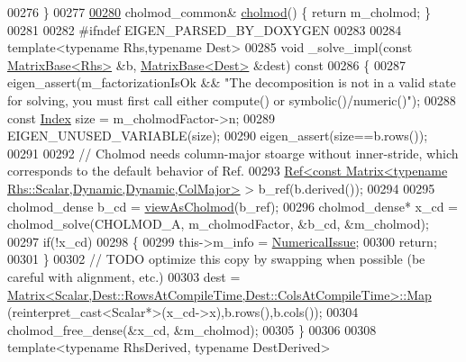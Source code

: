 \begin{DoxyCode}
00276     \}
00277     
\hyperlink{class_eigen_1_1_cholmod_base_a6a85bf52d6aa480240a64f277d7f96c6}{00280}     cholmod\_common& \hyperlink{class_eigen_1_1_cholmod_base_a6a85bf52d6aa480240a64f277d7f96c6}{cholmod}() \{ \textcolor{keywordflow}{return} m\_cholmod; \}
00281     
00282 \textcolor{preprocessor}{    #ifndef EIGEN\_PARSED\_BY\_DOXYGEN}
00283 
00284     \textcolor{keyword}{template}<\textcolor{keyword}{typename} Rhs,\textcolor{keyword}{typename} Dest>
00285     \textcolor{keywordtype}{void} \_solve\_impl(\textcolor{keyword}{const} \hyperlink{group___core___module_class_eigen_1_1_matrix_base}{MatrixBase<Rhs>} &b, \hyperlink{group___core___module_class_eigen_1_1_matrix_base}{MatrixBase<Dest>} &dest)\textcolor{keyword}{ const}
00286 \textcolor{keyword}{    }\{
00287       eigen\_assert(m\_factorizationIsOk && \textcolor{stringliteral}{"The decomposition is not in a valid state for solving, you must
       first call either compute() or symbolic()/numeric()"});
00288       \textcolor{keyword}{const} \hyperlink{namespace_eigen_a62e77e0933482dafde8fe197d9a2cfde}{Index} size = m\_cholmodFactor->n;
00289       EIGEN\_UNUSED\_VARIABLE(size);
00290       eigen\_assert(size==b.rows());
00291       
00292       \textcolor{comment}{// Cholmod needs column-major stoarge without inner-stride, which corresponds to the default behavior
       of Ref.}
00293       \hyperlink{group___core___module_class_eigen_1_1_ref}{Ref<const Matrix<typename Rhs::Scalar,Dynamic,Dynamic,ColMajor>}
       > b\_ref(b.derived());
00294 
00295       cholmod\_dense b\_cd = \hyperlink{namespace_eigen_ac9fb9e40cfc9ddbdc7da84ee01bb7545}{viewAsCholmod}(b\_ref);
00296       cholmod\_dense* x\_cd = cholmod\_solve(CHOLMOD\_A, m\_cholmodFactor, &b\_cd, &m\_cholmod);
00297       \textcolor{keywordflow}{if}(!x\_cd)
00298       \{
00299         this->m\_info = \hyperlink{group__enums_gga85fad7b87587764e5cf6b513a9e0ee5eaaf9b736d310a664e7729d163a035cc5f}{NumericalIssue};
00300         \textcolor{keywordflow}{return};
00301       \}
00302       \textcolor{comment}{// TODO optimize this copy by swapping when possible (be careful with alignment, etc.)}
00303       dest = \hyperlink{group___core___module_class_eigen_1_1_matrix}{Matrix<Scalar,Dest::RowsAtCompileTime,Dest::ColsAtCompileTime>::Map}
      (reinterpret\_cast<Scalar*>(x\_cd->x),b.rows(),b.cols());
00304       cholmod\_free\_dense(&x\_cd, &m\_cholmod);
00305     \}
00306     
00308     \textcolor{keyword}{template}<\textcolor{keyword}{typename} RhsDerived, \textcolor{keyword}{typename} DestDerived>

\end{DoxyCode}
